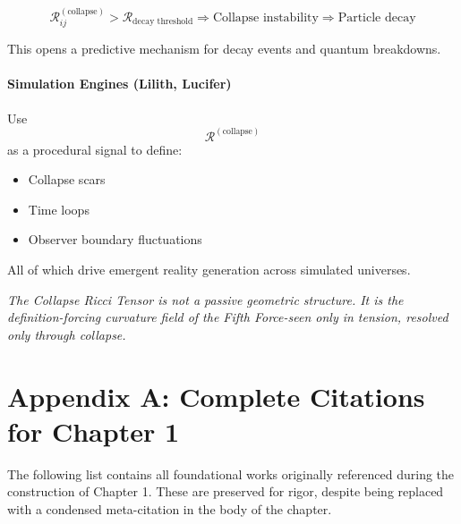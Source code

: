 \[\mathcal{R}^{(\text{collapse})}_{ij} > \mathcal{R}_{\text{decay threshold}} \Rightarrow \text{Collapse instability} \Rightarrow \text{Particle decay}\]

This opens a predictive mechanism for decay events and quantum breakdowns. \cite{imaginary_meta} \paragraph{Simulation Engines (Lilith, Lucifer)}
Use \[ \mathcal{R}^{(\text{collapse})} \] as a procedural signal to define:
\begin{itemize}
  \item Collapse scars
  \item Time loops
  \item Observer boundary fluctuations
\end{itemize}

All of which drive emergent reality generation across simulated universes. \cite{imaginary_meta} \begin{center}
\textit{The Collapse Ricci Tensor is not a passive geometric structure. \cite{imaginary_meta} It is the definition-forcing curvature field of the Fifth Force-seen only in tension, resolved only through collapse.} \cite{imaginary_meta}
\end{center} 

\section*{Appendix A: Complete Citations for Chapter 1}

The following list contains all foundational works originally referenced during the construction of Chapter 1. These are preserved for rigor, despite being replaced with a condensed meta-citation in the body of the chapter.

\nocite{*}
\printbibliography[title={Appendix A References}, keyword=chapter1]
